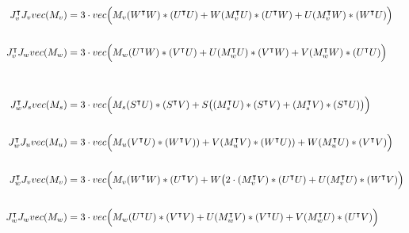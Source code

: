 \documentclass{article}
\begin{document}
\begin{eqnarray*}
    J_v^\intercal J_vvec(M_v) & = 3\cdot vec\Bigl(M_v(W^\intercal W)\ast (U^\intercal U) + W(M_v^\intercal U)\ast (U^\intercal W) + U(M_v^\intercal W)\ast (W^\intercal U)\Bigl) \\ \\
    J_v^\intercal J_wvec(M_w) & = 3\cdot vec\Bigl(M_w(U^\intercal W)\ast (V^\intercal U) + U(M_w^\intercal U)\ast (V^\intercal W) + V(M_w^\intercal W)\ast (U^\intercal U)\Bigl) \\ \\ \\
    J_w^\intercal J_svec(M_s) & = 3\cdot vec\Bigl(M_s(S^\intercal U)\ast (S^\intercal V) + S\bigl((M_s^\intercal U)\ast (S^\intercal V) + (M_s^\intercal V)\ast (S^\intercal U)\bigl)\Bigl) \\ \\
    J_w^\intercal J_uvec(M_u) & = 3\cdot vec\Bigl(M_u(V^\intercal U)\ast (W^\intercal V)) + V(M_u^\intercal V)\ast (W^\intercal U)) + W(M_u^\intercal U)\ast (V^\intercal V)\Bigl) \\ \\
    J_w^\intercal J_vvec(M_v) & = 3\cdot vec\Bigl(M_v(W^\intercal W)\ast (U^\intercal V) + W\bigl(2\cdot (M_v^\intercal V)\ast (U^\intercal U) + U(M_v^\intercal U)\ast (W^\intercal V)\Bigl) \\ \\
    J_w^\intercal J_wvec(M_w) & = 3\cdot vec\Bigl(M_w(U^\intercal U)\ast (V^\intercal V) + U(M_w^\intercal V)\ast (V^\intercal U) + V(M_w^\intercal U)\ast (U^\intercal V)\Bigl) \\ \\
\end{eqnarray*}
\end{document}
